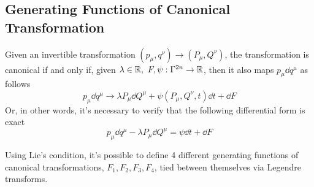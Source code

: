\documentclass[../admech.tex]{subfiles}
\begin{document}
\subsection{Generating Functions of Canonical Transformation}
\begin{thm}
	Given an invertible transformation $(p_\mu,q^\nu)\to(P_\mu,Q^\nu)$, the transformation is canonical if and only if, given $\lambda\in\operatorname{\mathbb{R}},\ F,\psi:\Gamma^{2n}\to\operatorname{\mathbb{R}}$, then it also maps $p_\mu\dd q^\mu$ as follows
	\begin{equation}
		p_\mu\dd q^\mu\to\lambda P_\mu\dd Q^\mu+\psi(P_\mu,Q^\nu,t)\dd t+\dd F
		\label{eq:canmapping}
	\end{equation}
	Or, in other words, it's necessary to verify that the following differential form is exact
	\begin{equation}
		p_\mu\dd q^\mu-\lambda P_\mu\dd Q^\mu=\psi\dd t+\dd F
		\label{eq:liecond}
	\end{equation}
\end{thm}
Using Lie's condition, it's possible to define 4 different generating functions of canonical transformations, $F_1,F_2,F_3,F_4$, tied between themselves via Legendre transforms.
\end{document}
